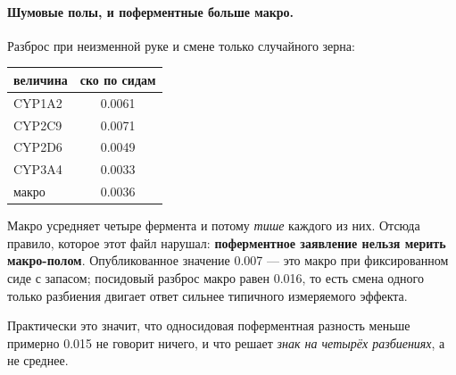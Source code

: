 \paragraph{Шумовые полы, и поферментные больше макро.} Разброс при неизменной руке и смене только
случайного зерна:

\begin{center}
\begin{tabular}{lc}
\toprule
величина & ско по сидам \\
\midrule
CYP1A2 & 0.0061 \\
CYP2C9 & 0.0071 \\
CYP2D6 & 0.0049 \\
CYP3A4 & 0.0033 \\
макро  & 0.0036 \\
\bottomrule
\end{tabular}
\end{center}

Макро усредняет четыре фермента и потому \emph{тише} каждого из них. Отсюда правило, которое этот файл
нарушал: \textbf{поферментное заявление нельзя мерить макро-полом}. Опубликованное значение 0.007 ---
это макро при фиксированном сиде с запасом; посидовый разброс макро равен 0.016, то есть смена одного
только разбиения двигает ответ сильнее типичного измеряемого эффекта.

Практически это значит, что односидовая поферментная разность меньше примерно 0.015 не говорит ничего,
и что решает \emph{знак на четырёх разбиениях}, а не среднее.
